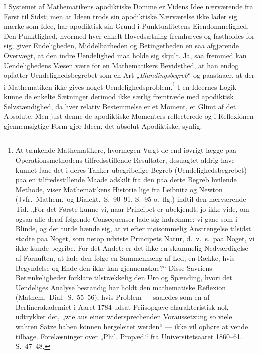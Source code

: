 \documentclass[12pt]{book}
\newcommand{\opage}[1]{\marginnote{\footnotesize\textit{[#1]}}}
\begin{document}
I Systemet af Mathematikens apodiktiske Domme er Videns Idee nærværende fra Først til Sidst; men at Ideen trods sin apodiktiske Nærværelse ikke lader sig mærke som Idee, har apodiktisk sin Grund i Punktualitetens Eiendommelighed. Den Punktlighed, hvormed hver enkelt Hovedsætning fremhæves og fastholdes for sig, giver Endeligheden, Middelbarheden og Betingetheden en saa afgjørende Overvægt, at den indre Uendelighed maa holde sig skjult. Ja, saa fremmed kan Uendelighedens Væsen være for en Mathematikers Bevidsthed, at han endog opfatter Uendelighedsbegrebet som en Art „\emph{Blandingsbegreb}“ og paastaaer, at der i Mathematiken ikke gives noget Uendelighedsproblem.\footnote{At tænkende Mathematikere, hvormegen Vægt de end iøvrigt lægge paa Operationsmethodens tilfredsstillende Resultater, desuagtet aldrig
have kunnet faae det i deres Tanker ubegribelige Begreb (Uendelighedsbegrebet) paa en tilfredsstillende Maade adskilt fra den paa dette Begreb hvilende Methode, viser Mathematikens Historie lige fra Leibnitz
og Newton (Jvfr.\ Mathem.\ og Dialekt.\ S.~90--91, S.~95 o.\ flg.) indtil den nærværende Tid. „For det Første kunne vi, naar Principet er ubekjendt, jo ikke vide, om ogsaa alle deraf følgende Consequenser lade sig indrømme: vi gaae som i Blinde, og det turde hænde sig, at vi efter møisommelig Anstrengelse tilsidst stødte paa Noget, som netop udviste Principets Natur, d.\ v.\ s.\ paa Noget, vi ikke kunde begribe. For det Andet: er det ikke en skammelig Nedværdigelse af Fornuften, at lade den følge en Sammenhæng af Led, en Række, hvis Begyndelse og Ende den ikke kan gjennemskue?“ Disse Savriens Betænkeligheder forklare tilstrækkelig den Uro og Spænding, hvori det Uendeliges Analyse bestandig har holdt den mathematiske Reflexion (Mathem.\ Dial.\ S.~55--56), hvis Problem --- saaledes som en af Berlinerakademiet i Aaret 1784 udsat Priisopgave charakteristisk nok udtrykker det, „wie aus einer widersprechenden Voraussetzung so viele wahren Sätze haben können hergeleitet werden“ --- ikke vil ophøre at vende tilbage. Forelæsninger over „Phil. Propæd.“ fra Universitetsaaret 1860--61. S.~47--48.}%
{} I en Ideernes Logik kunne de
\opage{263}enkelte Sætninger derimod ikke særlig fremtræde med apodiktisk Selvstændighed, da hver relativ Bestemmelse er et Moment, et Glimt af det Absolute. Men just denne de apodiktiske Momenters reflecterede og i Reflexionen gjennemsigtige Form gjør Ideen, det absolut Apodiktiske, synlig.
\end{document}
